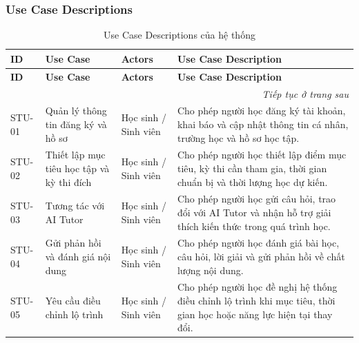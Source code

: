 
\subsubsection{Use Case Descriptions}
\label{subsubsec:use-case-descriptions}

\renewcommand{\arraystretch}{1.25}
\setlength{\tabcolsep}{5pt}
\small

\begin{longtable}{|p{}|p{}|p{}|p{}|}
\caption{Use Case Descriptions của hệ thống}
\label{tab:use-case-descriptions}\\
\hline
\rowcolor{orange!15}
\textbf{ID} & \textbf{Use Case} & \textbf{Actors} & \textbf{Use Case Description} \\
\hline
\endfirsthead

\hline
\rowcolor{orange!15}
\textbf{ID} & \textbf{Use Case} & \textbf{Actors} & \textbf{Use Case Description} \\
\hline
\endhead

\hline
\multicolumn{4}{r}{\textit{Tiếp tục ở trang sau}}\\
\endfoot

\hline
\endlastfoot

STU-01 &
Quản lý thông tin đăng ký và hồ sơ &
Học sinh / Sinh viên &
Cho phép người học đăng ký tài khoản, khai báo và cập nhật thông tin cá nhân, trường học và hồ sơ học tập. \\
\hline

STU-02 &
Thiết lập mục tiêu học tập và kỳ thi đích &
Học sinh / Sinh viên &
Cho phép người học thiết lập điểm mục tiêu, kỳ thi cần tham gia, thời gian chuẩn bị và thời lượng học dự kiến. \\
\hline

STU-03 &
Tương tác với AI Tutor &
Học sinh / Sinh viên &
Cho phép người học gửi câu hỏi, trao đổi với AI Tutor và nhận hỗ trợ giải thích kiến thức trong quá trình học. \\
\hline

STU-04 &
Gửi phản hồi và đánh giá nội dung &
Học sinh / Sinh viên &
Cho phép người học đánh giá bài học, câu hỏi, lời giải và gửi phản hồi về chất lượng nội dung. \\
\hline

STU-05 &
Yêu cầu điều chỉnh lộ trình &
Học sinh / Sinh viên &
Cho phép người học đề nghị hệ thống điều chỉnh lộ trình khi mục tiêu, thời gian học hoặc năng lực hiện tại thay đổi. \\
\hline


\end{longtable}
